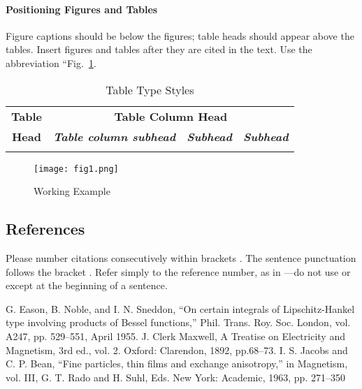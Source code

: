 \documentclass[conference]{IEEEtran}
\begin{document}
\paragraph{Positioning Figures and Tables} Figure captions should be 
below the figures; table heads should appear above the tables. Insert 
figures and tables after they are cited in the text. Use the abbreviation 
``Fig.~\ref{fig:Working Example}.

\begin{table}[ht]
    \caption{Table Type Styles}
	\centering
	\begin{tabular}{|c||c|c|c|}
		\hline
		\textbf{Table} & \multicolumn{3}{c|}{\textbf{Table Column Head}} \\
		\cline{2-4}
		\textbf{Head} & \textbf{\textit{Table column subhead}} & \textbf{\textit{Subhead}} & \textbf{\textit{Subhead}} \\
		\hline
		 &  & & \\
		\hline
	\end{tabular}
\end{table}

\begin{figure}[h]
    \centering
    \texttt{[image: fig1.png]}
    \caption{Working Example}
    \label{fig:Working Example}
\end{figure}


\subsection{References}
Please number citations consecutively within brackets \cite{b1}. 
The sentence punctuation follows the bracket \cite{b2}. Refer simply
to the reference number, as in \cite{b3}---do not use  or
 except at the beginning of a sentence.

\begin{thebibliography}{00}
 G. Eason, B. Noble, and I. N. Sneddon, ``On certain integrals of Lipschitz-Hankel type involving products of Bessel functions,'' Phil. Trans. Roy. Soc. London, vol. A247, pp. 529--551, April 1955.
 J. Clerk Maxwell, A Treatise on Electricity and Magnetism, 3rd ed., vol. 2. Oxford: Clarendon, 1892, pp.68--73.
 I. S. Jacobs and C. P. Bean, ``Fine particles, thin films and exchange anisotropy,'' in Magnetism, vol. III, G. T. Rado and H. Suhl, Eds. New York: Academic, 1963, pp. 271--350
\end{thebibliography}
\end{document}
